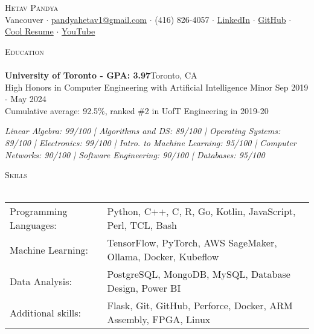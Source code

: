 \documentclass[a4paper]{article}
\newcommand{\lineunder} {
    \vspace*{-8pt} \\
    \hspace*{-18pt} \hrulefill \\
}
\newcommand{\header} [1] {
    {\hspace*{-18pt}\vspace*{6pt} \textsc{#1}}
    \vspace*{-6pt} \lineunder
}
\begin{document}
\vspace*{-50pt}



\vspace*{-10pt}
\begin{center}
	{\Huge \scshape {Hetav Pandya}}\\
	Vancouver $\cdot$ \href{mailto:pandyahetav1@gmail.com}{pandyahetav1@gmail.com} $\cdot$ (416) 826-4057 $\cdot$ \href{https://www.linkedin.com/in/hetav-pandya}{LinkedIn} $\cdot$ \href{https://github.com/pandyah5}{GitHub} $\cdot$ \href{https://pandyah5.github.io/terminalresume.github.io/}{Cool Resume} $\cdot$ \href{https://www.youtube.com/channel/UCShTJOo9ywLntiM4cqOz-KA}{YouTube}\\
\end{center}

\header{Education}
\textbf{University of Toronto - GPA: 3.97}\hfill Toronto, CA\\
High Honors in Computer Engineering with Artificial Intelligence Minor \hfill Sep 2019 - May 2024\\
Cumulative average: 92.5\%, ranked \#2 in UofT Engineering in 2019-20
\linebreak\\
\vspace{-3.5mm}
\begin{footnotesize}
\textit{Linear Algebra: 99/100 | Algorithms and DS: 89/100 | Operating Systems: 89/100 | Electronics: 99/100 | 
 Intro. to Machine Learning: 95/100 | Computer Networks: 90/100 | Software Engineering: 90/100 | Databases: 95/100}
\end{footnotesize}
\vspace{2mm}

\header{Skills}
\begin{small}
\begin{tabular}{ l l }
    Programming Languages: & Python, C++, C, R, Go, Kotlin, JavaScript, Perl, TCL, Bash             \\ 
	Machine Learning:      & TensorFlow, PyTorch, AWS SageMaker, Ollama, Docker, Kubeflow             \\
	Data Analysis:         & PostgreSQL, MongoDB, MySQL, Database Design, Power BI            \\
    Additional skills:     & Flask, Git, GitHub, Perforce, Docker, ARM Assembly, FPGA, Linux                      \\                               
\end{tabular}
\end{small}
\vspace{2mm}
\end{document}
